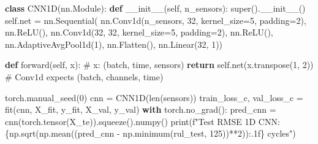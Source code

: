 \documentclass[
  letterpaper,
  DIV=11,
  numbers=noendperiod]{scrreprt}
\newenvironment{Shaded}{\begin{snugshade}}{\end{snugshade}}
\newcommand{\BuiltInTok}[1]{\textcolor[rgb]{0.00,0.23,0.31}{#1}}
\newcommand{\CommentTok}[1]{\textcolor[rgb]{0.37,0.37,0.37}{#1}}
\newcommand{\ControlFlowTok}[1]{\textcolor[rgb]{0.00,0.23,0.31}{\textbf{#1}}}
\newcommand{\DecValTok}[1]{\textcolor[rgb]{0.68,0.00,0.00}{#1}}
\newcommand{\FunctionTok}[1]{\textcolor[rgb]{0.28,0.35,0.67}{#1}}
\newcommand{\KeywordTok}[1]{\textcolor[rgb]{0.00,0.23,0.31}{\textbf{#1}}}
\newcommand{\NormalTok}[1]{\textcolor[rgb]{0.00,0.23,0.31}{#1}}
\newcommand{\OperatorTok}[1]{\textcolor[rgb]{0.37,0.37,0.37}{#1}}
\newcommand{\SpecialCharTok}[1]{\textcolor[rgb]{0.37,0.37,0.37}{#1}}
\newcommand{\SpecialStringTok}[1]{\textcolor[rgb]{0.13,0.47,0.30}{#1}}
\newcommand{\VariableTok}[1]{\textcolor[rgb]{0.07,0.07,0.07}{#1}}
\begin{document}
\begin{tcolorbox}[enhanced jigsaw, left=2mm, title=\textcolor{quarto-callout-caution-color}{\faFire}\hspace{0.5em}{Solution to Exercise 4}, opacityback=0, breakable, rightrule=.15mm, arc=.35mm, toptitle=1mm, colbacktitle=quarto-callout-caution-color!10!white, opacitybacktitle=0.6, coltitle=black, colframe=quarto-callout-caution-color-frame, bottomrule=.15mm, leftrule=.75mm, bottomtitle=1mm, titlerule=0mm, toprule=.15mm, colback=white]

\begin{Shaded}
\begin{Highlighting}[]
\KeywordTok{class}\NormalTok{ CNN1D(nn.Module):}
    \KeywordTok{def} \FunctionTok{\_\_init\_\_}\NormalTok{(}\VariableTok{self}\NormalTok{, n\_sensors):}
        \BuiltInTok{super}\NormalTok{().}\FunctionTok{\_\_init\_\_}\NormalTok{()}
        \VariableTok{self}\NormalTok{.net }\OperatorTok{=}\NormalTok{ nn.Sequential(}
\NormalTok{            nn.Conv1d(n\_sensors, }\DecValTok{32}\NormalTok{, kernel\_size}\OperatorTok{=}\DecValTok{5}\NormalTok{, padding}\OperatorTok{=}\DecValTok{2}\NormalTok{), nn.ReLU(),}
\NormalTok{            nn.Conv1d(}\DecValTok{32}\NormalTok{, }\DecValTok{32}\NormalTok{, kernel\_size}\OperatorTok{=}\DecValTok{5}\NormalTok{, padding}\OperatorTok{=}\DecValTok{2}\NormalTok{), nn.ReLU(),}
\NormalTok{            nn.AdaptiveAvgPool1d(}\DecValTok{1}\NormalTok{), nn.Flatten(), nn.Linear(}\DecValTok{32}\NormalTok{, }\DecValTok{1}\NormalTok{))}

    \KeywordTok{def}\NormalTok{ forward(}\VariableTok{self}\NormalTok{, x):                  }\CommentTok{\# x: (batch, time, sensors)}
        \ControlFlowTok{return} \VariableTok{self}\NormalTok{.net(x.transpose(}\DecValTok{1}\NormalTok{, }\DecValTok{2}\NormalTok{))  }\CommentTok{\# Conv1d expects (batch, channels, time)}

\NormalTok{torch.manual\_seed(}\DecValTok{0}\NormalTok{)}
\NormalTok{cnn }\OperatorTok{=}\NormalTok{ CNN1D(}\BuiltInTok{len}\NormalTok{(sensors))}
\NormalTok{train\_loss\_c, val\_loss\_c }\OperatorTok{=}\NormalTok{ fit(cnn, X\_fit, y\_fit, X\_val, y\_val)}
\ControlFlowTok{with}\NormalTok{ torch.no\_grad():}
\NormalTok{    pred\_cnn }\OperatorTok{=}\NormalTok{ cnn(torch.tensor(X\_te)).squeeze().numpy()}
\BuiltInTok{print}\NormalTok{(}\SpecialStringTok{f"Test RMSE 1D CNN: }\SpecialCharTok{\{}\NormalTok{np}\SpecialCharTok{.}\NormalTok{sqrt(np.mean((pred\_cnn }\OperatorTok{{-}}\NormalTok{ np.minimum(rul\_test, }\DecValTok{125}\NormalTok{))}\OperatorTok{**}\DecValTok{2}\NormalTok{))}\SpecialCharTok{:.1f\}}\SpecialStringTok{ cycles"}\NormalTok{)}
\end{Highlighting}
\end{Shaded}


\end{tcolorbox}
\end{document}
